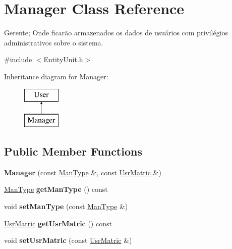 \hypertarget{classManager}{\section{Manager Class Reference}
\label{classManager}
}


Gerente; Onde ficarão armazenados os dados de usuários com privilégios administrativos sobre o sistema.  




{\ttfamily \#include $<$Entity\-Unit.\-h$>$}

Inheritance diagram for Manager\-:\begin{figure}[H]
\begin{center}
\leavevmode
\includegraphics[height=2.000000cm]{classManager}
\end{center}
\end{figure}
\subsection*{Public Member Functions}
\begin{DoxyCompactItemize}
\item 
\hypertarget{classManager_a94970a1ec6602001373fbd9be7bbbba5}{{\bfseries Manager} (const \hyperlink{classUsrType}{Man\-Type} \&, const \hyperlink{classUsrMatric}{Usr\-Matric} \&)}\label{classManager_a94970a1ec6602001373fbd9be7bbbba5}

\item 
\hypertarget{classManager_a255ac6a7e2112631001296fa8db3811b}{\hyperlink{classUsrType}{Man\-Type} {\bfseries get\-Man\-Type} () const }\label{classManager_a255ac6a7e2112631001296fa8db3811b}

\item 
\hypertarget{classManager_a3d4e9cb6cc0e8d9be47fcc086b4e584e}{void {\bfseries set\-Man\-Type} (const \hyperlink{classUsrType}{Man\-Type} \&)}\label{classManager_a3d4e9cb6cc0e8d9be47fcc086b4e584e}

\item 
\hypertarget{classManager_a462f3704b016b57e087db417df73f07a}{\hyperlink{classUsrMatric}{Usr\-Matric} {\bfseries get\-Usr\-Matric} () const }\label{classManager_a462f3704b016b57e087db417df73f07a}

\item 
\hypertarget{classManager_a93309a0dde84dd0b5fe90d9e1da49822}{void {\bfseries set\-Usr\-Matric} (const \hyperlink{classUsrMatric}{Usr\-Matric} \&)}\label{classManager_a93309a0dde84dd0b5fe90d9e1da49822}

\end{DoxyCompactItemize}


